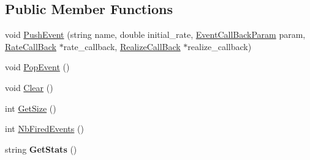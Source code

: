 \subsection*{Public Member Functions}
\begin{DoxyCompactItemize}
\item 
void \hyperlink{classelps_1_1_lab_event_stack_a0cf4b5b8bf78009aa20fc073f7ebfa6d}{Push\+Event} (string name, double initial\+\_\+rate, \hyperlink{namespaceelps_a1bd4230d698fa66dd38f0fc1cc5c2c55}{Event\+Call\+Back\+Param} param, \hyperlink{namespaceelps_a121bfb217e5fbb734b95d3f7b6653fb2}{Rate\+Call\+Back} $\ast$rate\+\_\+callback, \hyperlink{namespaceelps_adb49d5dbf827d9b190d0b1fd15e0193c}{Realize\+Call\+Back} $\ast$realize\+\_\+callback)
\item 
void \hyperlink{classelps_1_1_lab_event_stack_a6bf0e41eebd548c3c3bab27fadedbcab}{Pop\+Event} ()
\item 
void \hyperlink{classelps_1_1_lab_event_stack_a45504e766619df2f47b363ffa9512e93}{Clear} ()
\item 
int \hyperlink{classelps_1_1_lab_event_stack_a434b1f56f4914a40f191782866e413c2}{Get\+Size} ()
\item 
int \hyperlink{classelps_1_1_lab_event_stack_af4438f561679f472bec8c26defd51a5a}{Nb\+Fired\+Events} ()
\item 
\hypertarget{classelps_1_1_lab_event_stack_a6c7b1ca2b9ddc8ed00e77a2003437daf}{string {\bfseries Get\+Stats} ()}\label{classelps_1_1_lab_event_stack_a6c7b1ca2b9ddc8ed00e77a2003437daf}


\end{DoxyCompactItemize}
